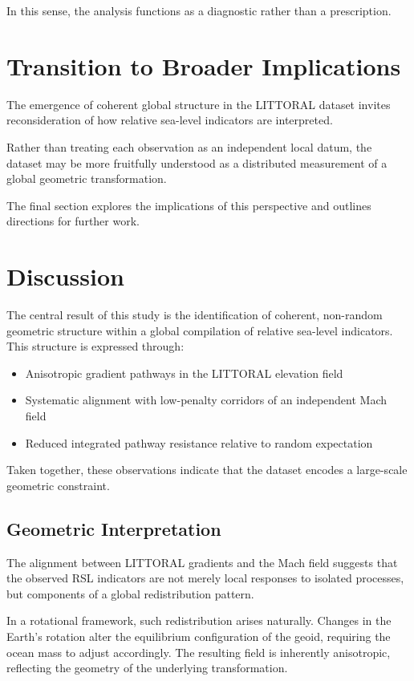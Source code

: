 \documentclass[twocolumn]{article}
\begin{document}
In this sense, the analysis functions as a diagnostic rather than a prescription.

\section{Transition to Broader Implications}

The emergence of coherent global structure in the LITTORAL dataset invites reconsideration of how relative sea-level indicators are interpreted.

Rather than treating each observation as an independent local datum, the dataset may be more fruitfully understood as a distributed measurement of a global geometric transformation.

The final section explores the implications of this perspective and outlines directions for further work.

\section{Discussion}

The central result of this study is the identification of coherent, non-random geometric structure within a global compilation of relative sea-level indicators. This structure is expressed through:

\begin{itemize}
\item Anisotropic gradient pathways in the LITTORAL elevation field
\item Systematic alignment with low-penalty corridors of an independent Mach field
\item Reduced integrated pathway resistance relative to random expectation
\end{itemize}

Taken together, these observations indicate that the dataset encodes a large-scale geometric constraint.

\subsection{Geometric Interpretation}

The alignment between LITTORAL gradients and the Mach field suggests that the observed RSL indicators are not merely local responses to isolated processes, but components of a global redistribution pattern.

In a rotational framework, such redistribution arises naturally. Changes in the Earth's rotation alter the equilibrium configuration of the geoid, requiring the ocean mass to adjust accordingly. The resulting field is inherently anisotropic, reflecting the geometry of the underlying transformation.
\end{document}
